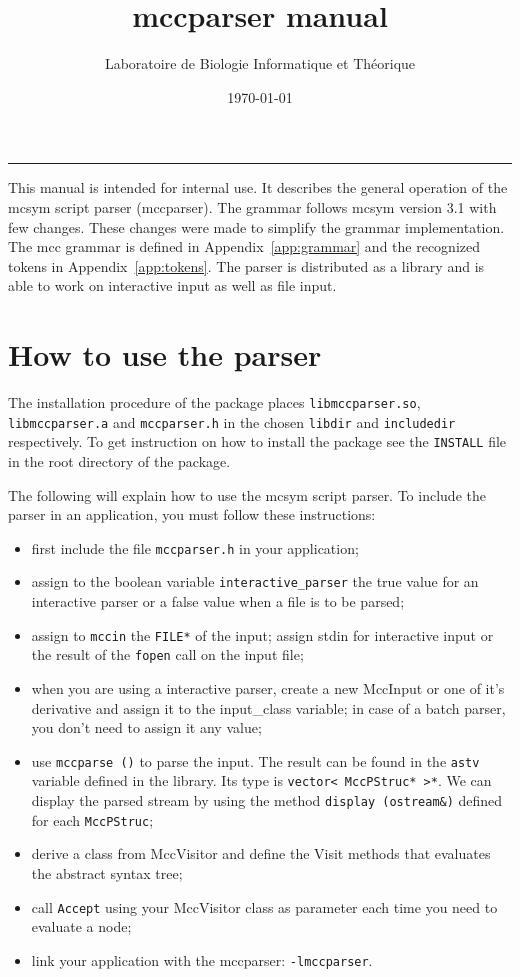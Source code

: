 \documentclass[11pt]{article}
\title{{\sc mccparser} manual}
\author{Laboratoire de Biologie Informatique et Théorique}
\date{\today}
\begin{document}
\maketitle

{\parindent 0pt \rule{\textwidth}{.5mm}}

\vspace{20pt}


This manual is intended for internal use.  It describes the general
operation of the {\sc mcsym} script parser ({\sc mccparser}).  The grammar
follows {\sc mcsym} version 3.1 with few changes.  These changes were made
to simplify the grammar implementation.  The mcc grammar is defined in
Appendix~\ref{app:grammar} and the recognized tokens in
Appendix~\ref{app:tokens}.  The parser is distributed as a library and is
able to work on interactive input as well as file input.

\section{How to use the parser}

The installation procedure of the package places {\tt libmccparser.so},
{\tt libmccparser.a} and {\tt mccparser.h} in the chosen {\tt libdir} and
{\tt includedir} respectively.  To get instruction on how to install the
package see the {\tt INSTALL} file in the root directory of the package.

\noindent The following will explain how to use the mcsym script parser.
To include the parser in an application, you must follow these instructions:
\begin{itemize}
\item first include the file {\tt mccparser.h} in your application;
\item assign to the boolean variable {\tt interactive\_parser} the true
  value for an interactive parser or a false value when a file is to be
  parsed;
\item assign to {\tt mccin} the {\tt FILE*} of the input; assign stdin for
  interactive input or the result of the {\tt fopen} call on the input file;
\item when you are using a interactive parser, create a new MccInput or one
  of it's derivative and assign it to the input\_class variable; in case of
  a batch parser, you don't need to assign it any value;
\item use {\tt mccparse ()} to parse the input.  The result can be found
  in the {\tt astv} variable defined in the library.  Its type is
  \verb+vector< MccPStruc* >*+.  We can display the parsed stream by using
  the method {\tt display (ostream\&)} defined for each {\tt MccPStruc};
\item derive a class from MccVisitor and define the Visit methods that
  evaluates the abstract syntax tree;
\item call {\tt Accept} using your MccVisitor class as parameter each time
  you need to evaluate a node;
\item link your application with the mccparser: {\tt -lmccparser}.
\end{itemize}
\end{document}
